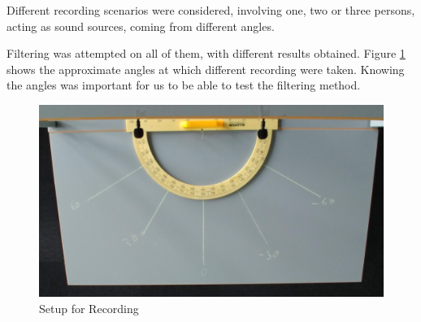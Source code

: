 Different recording scenarios were considered, involving one, two or three persons, acting as sound sources,
coming from different angles.

Filtering was attempted on all of them, with different results obtained.
\newpage
Figure \ref{fig:recSetup} shows the approximate angles at which different recording were taken. Knowing the 
angles was important for us to be able to test the filtering method.

\begin{figure}[htp]
	\centering
	\includegraphics[width=1\textwidth]{Illustrations/JustSetup.jpg}
	\caption{Setup for Recording}
	\label{fig:recSetup}
\end{figure}



 

